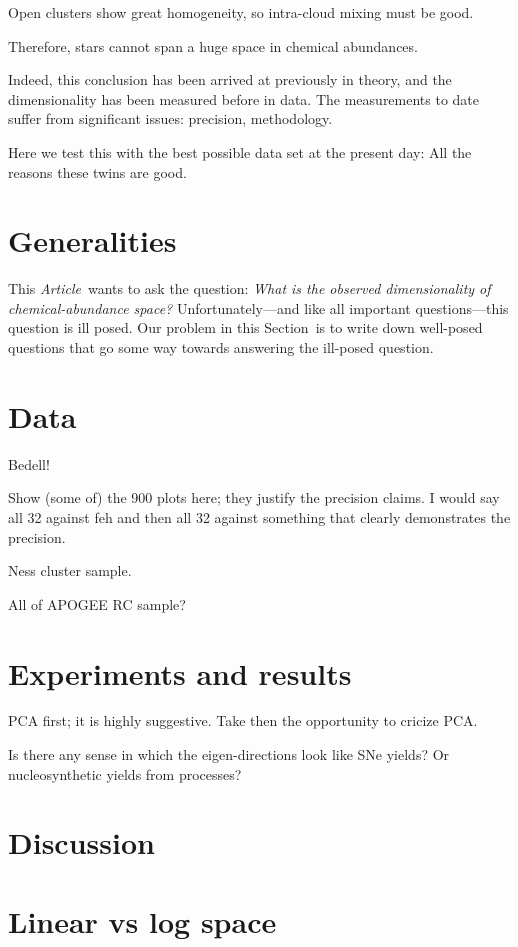 \documentclass[letterpaper, modern]{aastex62}
\newcommand{\documentname}{\textsl{Article}}
\newcommand{\sectionname}{Section}
\begin{document}
Open clusters show great homogeneity, so intra-cloud mixing must be good.

Therefore, stars cannot span a huge space in chemical abundances.

Indeed, this conclusion has been arrived at previously in theory, and
the dimensionality has been measured before in data. The measurements to
date suffer from significant issues: precision, methodology.

Here we test this with the best possible data set at the present day:
All the reasons these twins are good.

\section{Generalities}

This \documentname\ wants to ask the question:
\emph{What is the observed dimensionality of chemical-abundance
  space?}
Unfortunately---and like all important questions---this question is
ill posed.
Our problem in this \sectionname\ is to write down well-posed questions
that go some way towards answering the ill-posed question.

\section{Data}

Bedell!

Show (some of) the 900 plots here; they justify the precision claims.
I would say all 32 against feh and then all 32 against something that
clearly demonstrates the precision.

Ness cluster sample.

All of APOGEE RC sample?

\section{Experiments and results}

PCA first; it is highly suggestive. Take then the opportunity to cricize PCA.

Is there any sense in which the eigen-directions look like SNe yields?
Or nucleosynthetic yields from processes?

\section{Discussion}

\appendix
\section{Linear vs log space}
\end{document}
